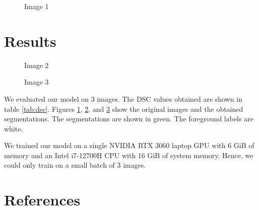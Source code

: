 \documentclass[a4paper]{article}
\begin{document}
\begin{figure}[h!]
    \centering
    \resizebox{0.7\textwidth}{!}{}
    \caption{Image 1}
    \label{fig:results-1}
\end{figure}

\section{Results}

\begin{figure}[h!]
    \centering
    \resizebox{0.7\textwidth}{!}{}
    \caption{Image 2}
    \label{fig:results-2}
\end{figure}

\begin{figure}[h!]
    \centering
    \resizebox{0.7\textwidth}{!}{}
    \caption{Image 3}
    \label{fig:results-3}
\end{figure}

We evaluated our model on 3 images. The DSC values obtained are shown in table
\ref{tab:dsc}. Figures \ref{fig:results-1}, \ref{fig:results-2}, and
\ref{fig:results-3} show the original images and the obtained segmentations. The
segmentations are shown in green. The foreground labels are white.

We trained our model on a single NVIDIA RTX 3060 laptop GPU with 6 GiB of memory
and an Intel i7-12700H CPU with 16 GiB of system memory. Hence, we could only
train on a small batch of 3 images.

\section{References}
\printbibliography[heading=none]
\end{document}
